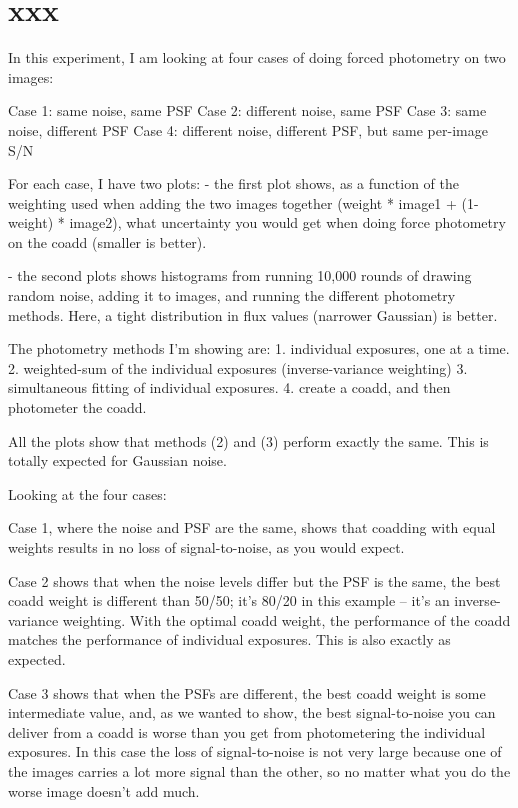 \documentclass[letter,11pt]{article}
\begin{document}
\section*{xxx}


In this experiment, I am looking at four cases of doing forced photometry on two images:

Case 1: same noise, same PSF
Case 2: different noise, same PSF
Case 3: same noise, different PSF
Case 4: different noise, different PSF, but same per-image S/N

For each case, I have two plots:
- the first plot shows, as a function of the weighting used when adding the two images together (weight * image1 + (1-weight) * image2), what uncertainty you would get when doing force photometry on the coadd (smaller is better).

- the second plots shows histograms from running 10,000 rounds of drawing random noise, adding it to images, and running the different photometry methods.  Here, a tight distribution in flux values (narrower Gaussian) is better.

The photometry methods I'm showing are:
1. individual exposures, one at a time.
2. weighted-sum of the individual exposures (inverse-variance weighting)
3. simultaneous fitting of individual exposures.
4. create a coadd, and then photometer the coadd.

All the plots show that methods (2) and (3) perform exactly the same.  This is totally expected for Gaussian noise.

Looking at the four cases:

Case 1, where the noise and PSF are the same, shows that coadding with equal weights results in no loss of signal-to-noise, as you would expect.

Case 2 shows that when the noise levels differ but the PSF is the same, the best coadd weight is different than 50/50; it's 80/20 in this example -- it's an inverse-variance weighting.  With the optimal coadd weight, the performance of the coadd matches the performance of individual exposures.  This is also exactly as expected.

Case 3 shows that when the PSFs are different, the best coadd weight is some intermediate value, and, as we wanted to show, the best signal-to-noise you can deliver from a coadd is worse than you get from photometering the individual exposures.  In this case the loss of signal-to-noise is not very large because one of the images carries a lot more signal than the other, so no matter what you do the worse image doesn't add much.
\end{document}
